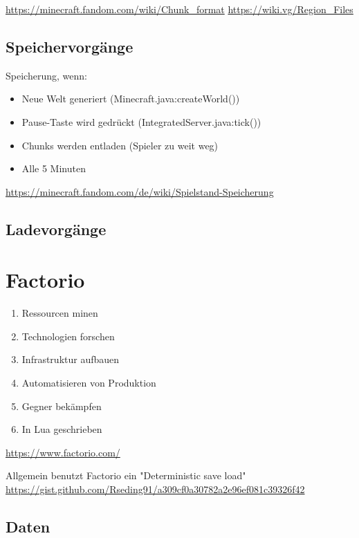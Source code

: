\url{https://minecraft.fandom.com/wiki/Chunk_format}
\url{https://wiki.vg/Region_Files}

\subsection{Speichervorgänge}

Speicherung, wenn:
\begin{itemize}
    \item Neue Welt generiert (Minecraft.java:createWorld())
    \item Pause-Taste wird gedrückt (IntegratedServer.java:tick())
    \item Chunks werden entladen (Spieler zu weit weg)
    \item Alle 5 Minuten
\end{itemize}

\url{https://minecraft.fandom.com/de/wiki/Spielstand-Speicherung}

\subsection{Ladevorgänge}



\section{Factorio}
\begin{enumerate}
    \item Ressourcen minen 
    \item Technologien forschen
    \item Infrastruktur aufbauen
    \item Automatisieren von Produktion
    \item Gegner bekämpfen
    \item In Lua geschrieben
\end{enumerate}
\url{https://www.factorio.com/}

Allgemein benutzt Factorio ein "Deterministic save load"
\url{https://gist.github.com/Rseding91/a309cf0a30782a2e96ef081c39326f42}


\subsection{Daten}

